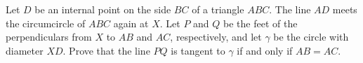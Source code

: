 Let $D$ be an internal point on the side $BC$ of a triangle $ABC$. The line $AD$ meets the circumcircle of $ABC$ again at $X$. Let $P$ and $Q$ be the feet of the perpendiculars from $X$ to $AB$ and $AC$, respectively, and let $\gamma$ be the circle with diameter $XD$. Prove that the line $PQ$ is tangent to $\gamma$ if and only if $AB = AC$.
